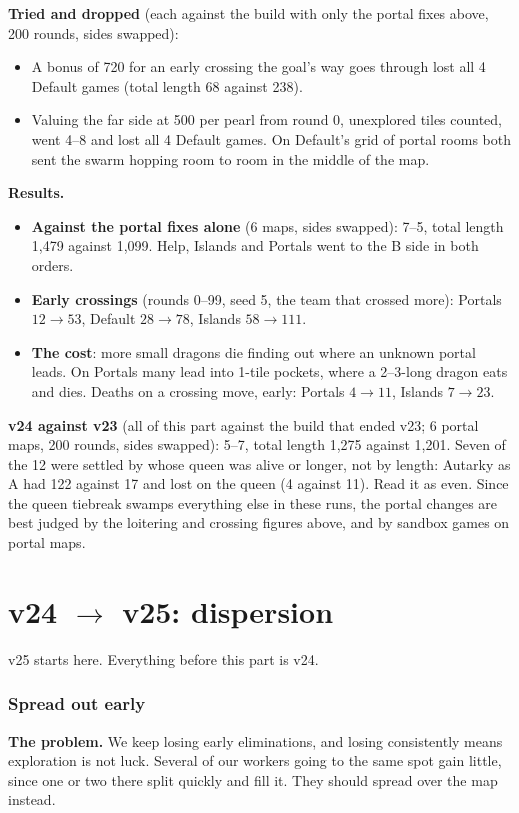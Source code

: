 \documentclass[11pt,a4paper]{article}
\begin{document}
\textbf{Tried and dropped} (each against the build with only the portal fixes above, 200 rounds, sides swapped):
\begin{itemize}
      \item A bonus of 720 for an early crossing the goal's way goes through lost all 4 Default games (total length 68 against 238).
      \item Valuing the far side at 500 per pearl from round 0, unexplored tiles counted, went 4--8 and lost all 4 Default games.
            On Default's grid of portal rooms both sent the swarm hopping room to room in the middle of the map.
\end{itemize}
\textbf{Results.}
\begin{itemize}
      \item \textbf{Against the portal fixes alone} (6 maps, sides swapped): 7--5, total length 1,479 against 1,099.
            Help, Islands and Portals went to the B side in both orders.
      \item \textbf{Early crossings} (rounds 0--99, seed 5, the team that crossed more): Portals $12 \rightarrow 53$, Default $28 \rightarrow 78$,
            Islands $58 \rightarrow 111$.
      \item \textbf{The cost}: more small dragons die finding out where an unknown portal leads. On Portals many lead into
            1-tile pockets, where a 2--3-long dragon eats and dies. Deaths on a crossing move, early: Portals $4 \rightarrow 11$,
            Islands $7 \rightarrow 23$.
\end{itemize}
\textbf{v24 against v23} (all of this part against the build that ended v23; 6 portal maps, 200 rounds, sides swapped): 5--7,
total length 1,275 against 1,201. Seven of the 12 were settled by whose queen was alive or longer, not by length: Autarky as A
had 122 against 17 and lost on the queen (4 against 11). Read it as even. Since the queen tiebreak swamps everything else in
these runs, the portal changes are best judged by the loitering and crossing figures above, and by sandbox games on portal maps.

\part{v24 $\rightarrow$ v25: dispersion}
v25 starts here. Everything before this part is v24.

\section{Spread out early}\label{sec:disperse}
\textbf{The problem.} We keep losing early eliminations, and losing consistently means exploration is not luck. Several of our
workers going to the same spot gain little, since one or two there split quickly and fill it. They should spread over the map
instead.
\end{document}
